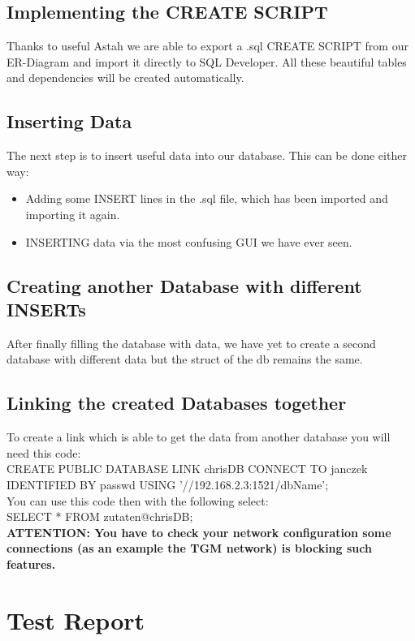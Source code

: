 \documentclass[11pt,a4paper]{article}
\begin{document}
\subsection{Implementing the CREATE SCRIPT}
Thanks to useful Astah we are able to export a .sql CREATE SCRIPT from our ER-Diagram and import it directly to SQL Developer. All these beautiful tables and dependencies will be created automatically.
\subsection{Inserting Data}
The next step is to insert useful data into our database. This can be done either way:
\begin{itemize}
	\item Adding some INSERT lines in the .sql file, which has been imported and importing it again.
	\item INSERTING data via the most confusing GUI we have ever seen.
\end{itemize}
\subsection{Creating another Database with different INSERTs}
After finally filling the database with data, we have yet to create a second database with different data but the struct of the db remains the same.
\subsection{Linking the created Databases together}
To create a link which is able to get the data from another database you will need this code:\\

CREATE PUBLIC DATABASE LINK chrisDB
CONNECT TO janczek IDENTIFIED BY passwd
USING '//192.168.2.3:1521/dbName';\\

You can use this code then with the following select:\\

SELECT * FROM zutaten@chrisDB;\\

\bf ATTENTION: You have to check your network configuration some connections (as an example the TGM network) is blocking such features. \\
\newpage

\section{Test Report}
\newpage



\end{document}
